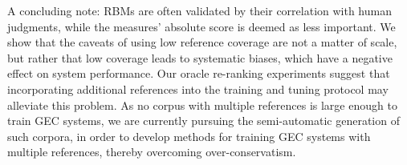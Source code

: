 \documentclass[a4paper, 11pt]{article}
\newcommand{\lc}[1]{\footnote{\color{blue}LC: #1}}
\begin{document}
A concluding note: RBMs are often validated by their correlation with human judgments, while the measures' absolute score is deemed as less important. 
We show that the caveats of using low reference coverage are not a matter of scale, but rather that
low coverage leads to systematic biases, which have a negative effect on system performance.
Our oracle re-ranking experiments suggest that incorporating additional references into the training and tuning protocol may alleviate this problem. 
As no corpus with multiple references is large enough to train GEC systems,
we are currently pursuing the semi-automatic generation of such corpora, in order to develop methods
for training GEC systems with multiple references, thereby overcoming over-conservatism.


%
%
%





\end{document}
